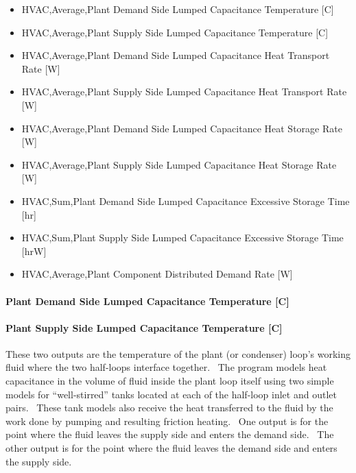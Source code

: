 \begin{itemize}
\item
  HVAC,Average,Plant Demand Side Lumped Capacitance Temperature {[}C{]}
\item
  HVAC,Average,Plant Supply Side Lumped Capacitance Temperature {[}C{]}


\item
  HVAC,Average,Plant Demand Side Lumped Capacitance Heat Transport Rate {[}W{]}
\item
  HVAC,Average,Plant Supply Side Lumped Capacitance Heat Transport Rate {[}W{]}
\item
  HVAC,Average,Plant Demand Side Lumped Capacitance Heat Storage Rate {[}W{]}
\item
  HVAC,Average,Plant Supply Side Lumped Capacitance Heat Storage Rate {[}W{]}
\item
  HVAC,Sum,Plant Demand Side Lumped Capacitance Excessive Storage Time {[}hr{]}
\item
  HVAC,Sum,Plant Supply Side Lumped Capacitance Excessive Storage Time {[}hrW{]}


\item
  HVAC,Average,Plant Component Distributed Demand Rate {[}W{]}
\end{itemize}

\paragraph{Plant Demand Side Lumped Capacitance Temperature {[}C{]}}\label{plant-demand-side-lumped-capacitance-temperature-c}

\paragraph{Plant Supply Side Lumped Capacitance Temperature {[}C{]}}\label{plant-supply-side-lumped-capacitance-temperature-c}

These two outputs are the temperature of the plant (or condenser) loop's working fluid where the two half-loops interface together.~ The program models heat capacitance in the volume of fluid inside the plant loop itself using two simple models for ``well-stirred'' tanks located at each of the half-loop inlet and outlet pairs.~ These tank models also receive the heat transferred to the fluid by the work done by pumping and resulting friction heating.~ One output is for the point where the fluid leaves the supply side and enters the demand side.~ The other output is for the point where the fluid leaves the demand side and enters the supply side.

